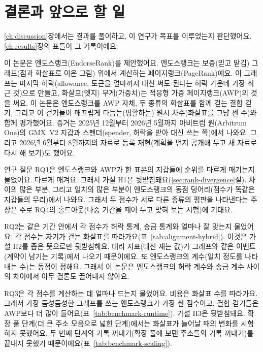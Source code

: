 \chapter{결론과 앞으로 할 일}
\label{ch:conclusion}

\ref{ch:discussion}장에서는 결과를 풀이하고, 이 연구가 목표를 이루었는지 판단했어요. \ref{ch:results}장의 표들이 그 기록이에요.


이 논문은 엔도스랭크(EndorseRank)를 제안했어요. 엔도스랭크는 보증(믿고 맡김) 그래프(점과 화살표로 이은 그림) 위에서 계산하는 페이지랭크(PageRank)예요. 이 그래프는 마지막 허락(allowance, 토큰을 얼마까지 대신 써도 된다는 허락 가운데 가장 최근 것)으로 만들고, 화살표(엣지) 무게(가중치)는 적응형 가중 페이지랭크(AWP)의 것을 써요. 이 논문은 엔도스랭크를 AWP 자체, 두 종류의 화살표를 함께 걷는 결합 걷기, 그리고 이 걷기들이 매끄럽게 다듬는(평활하는) 원시 차수(화살표를 그냥 센 수)와 함께 평가했어요. 증거는 2025년 12월부터 2026년 5월까지 아비트럼 원(Arbitrum One)의 GMX~V2 지갑과 스펜더(spender, 허락을 받아 대신 쓰는 쪽)에서 나와요. 그리고 2026년 6월부터 8월까지의 자료로 등록 재현(계획을 먼저 공개해 두고 새 자료로 다시 해 보기)도 했어요.

연구 질문 RQ1은 엔도스랭크와 AWP가 한 표본의 지갑들에 순위를 다르게 매기는지 물었어요. 다르게 매겨요. 그래서 가설 H1은 뒷받침돼요(\ref{sec:rank-divergence}절). 차이의 많은 부분, 그리고 일치의 많은 부분이 엔도스랭크의 동점 덩어리(점수가 똑같은 지갑들의 무리)에서 나와요. 그래서 두 점수가 서로 다른 종류의 평판을 나타낸다는 주장은 주로 RQ4의 홀드아웃(나중 기간을 떼어 두고 맞혀 보는 시험)에 기대요.

RQ2는 같은 기간 안에서 각 점수가 허락 통계, 송금 통계와 얼마나 잘 맞는지 물었어요. 각 점수는 자기가 걷는 화살표를 따라가요(표~\ref{tab:alignment-hybrid}). 이것은 가설 H2를 좁은 뜻으로만 뒷받침해요. 대리 지표(대신 재는 값)가 그래프와 같은 이벤트(계약이 남기는 기록)에서 나오기 때문이에요. 또 엔도스랭크의 계수(일치 정도를 나타내는 수)는 동점이 정해요. 그래서 이 논문은 엔도스랭크의 허락 계수와 송금 계수 사이의 차이에서 아무 결론도 끌어내지 않아요.

RQ3은 각 점수를 계산하는 데 얼마나 드는지 물었어요. 비용은 화살표 수를 따라가요. 그래서 가장 듬성듬성한 그래프를 쓰는 엔도스랭크가 가장 싼 점수이고, 결합 걷기들은 AWP보다 더 많이 들어요(표~\ref{tab:benchmark-runtime}). 가설 H3은 뒷받침돼요. 확장 풀 단계(더 큰 주소 모음으로 넓힌 단계)에서는 화살표가 늘어날 때의 변화를 시험하지 못했어요. 두 번째 단계의 기록 꺼내기(확장 풀에 보탠 주소들의 기록 꺼내기)를 끝내지 못했기 때문이에요(표~\ref{tab:benchmark-scaling}).

